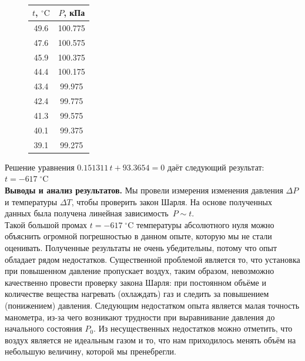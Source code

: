 \documentclass{article}
\begin{document}
\begin{figure}[htb]
	\\
	
	\begin{tabular}{c|c}
		$t$, $^\circ\mbox{C}$&$P$, кПа\\
		\hline
		49.6&100.775\\
		47.6& 100.575\\
		45.9&100.375\\
		44.4& 100.175\\
		43.4& 99.975\\
		42.4& 99.775\\
		41.3&99.575\\
		40.1&99.375\\
		39.1&99.275\\
	\end{tabular}
\end{figure}

Решение уравнения $  0.151311\,t+93.3654=0$ даёт следующий результат: $ t=-617\;^\circ\mbox{C} $\\


\textbf{Выводы и анализ результатов.}
Мы провели измерения изменения давления $\Delta P$ и температуры $\Delta T$, чтобы проверить закон Шарля. На основе полученных данных была получена линейная зависимость~$P \sim t$.\\Такой большой промах $ t=-617\;^\circ\mbox{C} $ температуры абсолютного нуля можно объяснить огромной погрешностью в данном опыте, которую мы не стали оценивать. Полученные результаты не очень убедительны, потому что опыт обладает рядом недостатков. Существенной проблемой является то, что установка при повышенном давление пропускает воздух, таким образом, невозможно качественно провести проверку закона Шарля: при постоянном объёме и количестве вещества нагревать (охлаждать) газ и следить за повышением (понижением) давления. Следующим недостатком опыта является малая точность манометра, из-за чего возникают трудности при выравнивание давления до начального состояния $P_0$. Из несущественных недостатков можно отметить, что воздух является не идеальным газом и то, что нам приходилось менять объём на небольшую величину, которой мы пренебрегли.
\end{document}
